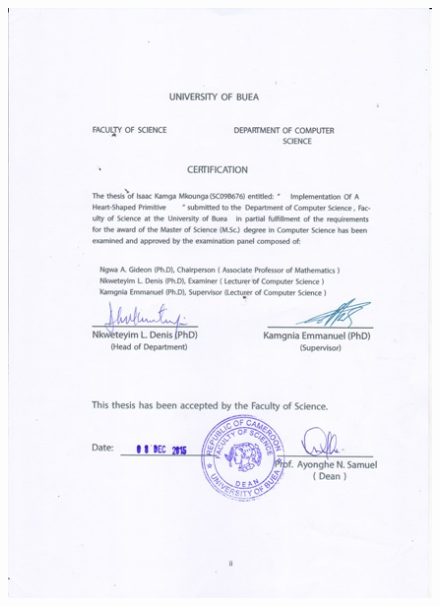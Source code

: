 \documentclass[11pt, oneside]{Thesis} %
\begin{document}
\clearpage %

\begin{figure}[htbp]
\centering
\includegraphics[trim=0.0cm 0.0cm 0.0cm 0.0cm, clip=true, totalheight=1.0\textheight]{Figures/certification.jpg}
\end{figure}
\end{document}
